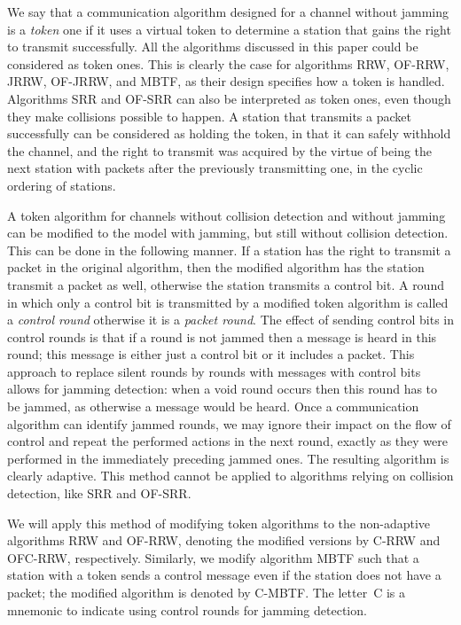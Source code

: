 \documentclass[11pt]{article}
\begin{document}
We say that a communication algorithm designed for a channel without jamming is a \emph{token} one if it uses a virtual token to determine a station that gains the right to transmit successfully.
All the algorithms discussed in this paper could be considered as token ones.
This is clearly the case for algorithms \textsc{RRW}, \textsc{OF-RRW}, \textsc{JRRW}, \textsc{OF-JRRW}, and \textsc{MBTF}, as  their design specifies how a token is handled.
Algorithms \textsc{SRR} and \textsc{OF-SRR} can also be interpreted as token ones, even though they make collisions possible to happen.
A station that transmits a packet successfully can be considered as holding the token, in that it can safely withhold the channel, and the right to transmit was acquired by the virtue of being the next station with packets after the previously transmitting one, in the cyclic ordering of stations. 



A token algorithm for channels without collision detection and without jamming can be modified to the model with jamming, but still without collision detection.
This can be done in the following manner.
If a station has the right to transmit a packet in the original algorithm, then the modified algorithm has the station transmit a packet as well, otherwise the station transmits a control bit.
A round in which only a control bit is transmitted by a modified token algorithm is called a  \emph{control round} otherwise it is a \emph{packet round}.
The effect of sending control bits in control rounds is that if a round is not jammed then a message is heard in this round; this message is either just a control bit or it includes a packet.
This approach to replace silent rounds by rounds with messages with control bits allows for jamming detection: when a void round occurs  then this round has to be jammed, as otherwise a message would be heard.
Once a communication algorithm can identify jammed rounds, we may ignore their impact on the flow of control and repeat the performed actions in the next round, exactly as they were performed in the immediately preceding jammed ones. 
The resulting algorithm is clearly adaptive.
This method cannot be applied to algorithms relying on collision detection, like \textsc{SRR} and \textsc{OF-SRR}.

We will apply this method of modifying token algorithms to the non-adaptive algorithms \textsc{RRW} and \textsc{OF-RRW},  denoting the modified versions by \textsc{C-RRW} and \textsc{OFC-RRW}, respectively.
Similarly, we modify algorithm \textsc{MBTF} such that a station with a token sends a control message even if the station does not have a packet; the modified algorithm is denoted by \textsc{C-MBTF}.
The letter~C is a mnemonic to indicate using control rounds for jamming detection.
\end{document}

